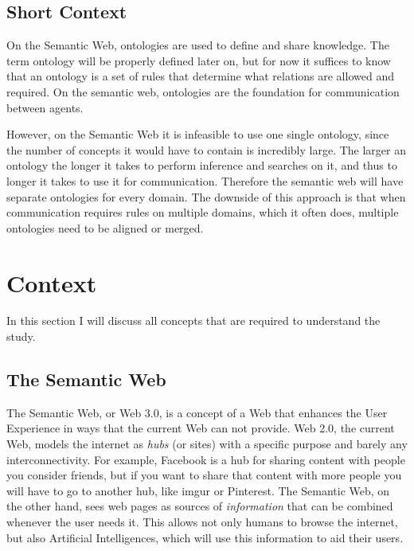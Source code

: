 \documentclass{article}
\begin{document}
 \subsection{Short Context}
 On the Semantic Web, ontologies are used to define and share knowledge. The term ontology will be properly defined later on, but for now it suffices to know that an ontology is a set of rules that determine what relations are allowed and required. On the semantic web, ontologies are the foundation for communication between agents.
 
 However, on the Semantic Web it is infeasible to use one single ontology, since the number of concepts it would have to contain is incredibly large. The larger an ontology the longer it takes to perform inference and searches on it, and thus to longer it takes to use it for communication. Therefore the semantic web will have separate ontologies for every domain. The downside of this approach is that when communication requires rules on multiple domains, which it often does, multiple ontologies need to be aligned or merged.
 
 
\section{Context}
 In this section I will discuss all concepts that are required to understand the study.
 \subsection{The Semantic Web}
 The Semantic Web, or Web 3.0, is a concept of a Web that enhances the User Experience in ways that the current Web can not provide. Web 2.0, the current Web, models the internet as \textit{hubs} (or sites) with a specific purpose and barely any interconnectivity. For example, Facebook is a hub for sharing content with people you consider friends, but if you want to share that content with more people you will have to go to another hub, like imgur or Pinterest.
The Semantic Web, on the other hand, sees web pages as sources of \textit{information} that can be combined whenever the user needs it. This allows not only humans to browse the internet, but also Artificial Intelligences, which will use this information to aid their users.
\end{document}
